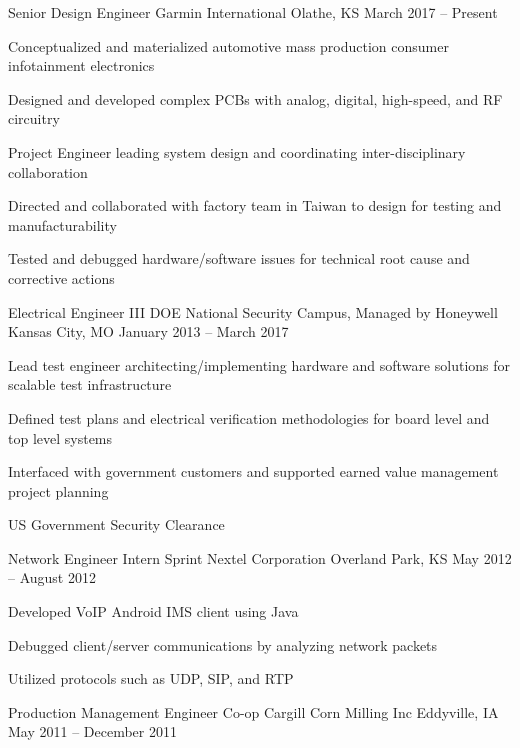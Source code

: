 \documentclass[]{awesome-cv}
\begin{document}
\vspace{-2mm}
\begin{cventries}
	\cventry
	{Senior Design Engineer}
	{Garmin International}
	{Olathe, KS}
	{March 2017 – Present}
	{\begin{cvitems}
		\item {Conceptualized and materialized automotive mass production consumer infotainment electronics}
		\item {Designed and developed complex PCBs with analog, digital, high-speed, and RF circuitry}
		\item {Project Engineer leading system design and coordinating inter-disciplinary collaboration}
		\item {Directed and collaborated with factory team in Taiwan to design for testing and manufacturability}
		\item {Tested and debugged hardware/software issues for technical root cause and corrective actions}
		\end{cvitems}}
	\cventry
	{Electrical Engineer III}
	{DOE National Security Campus, Managed by Honeywell}
	{Kansas City, MO}
	{January 2013 – March 2017}
	{\begin{cvitems}
		\item {Lead test engineer architecting/implementing hardware and software solutions for scalable test infrastructure}
		\item {Defined test plans and electrical verification methodologies for board level and top level systems}
		\item {Interfaced with government customers and supported earned value management project planning}
		\item {US Government Security Clearance }
		\end{cvitems}}
	\cventry
	{Network Engineer Intern}
	{Sprint Nextel Corporation}
	{Overland Park, KS}
	{May 2012 – August 2012}
	{\begin{cvitems}
		\item {Developed VoIP Android IMS client using Java}
		\item {Debugged client/server communications by analyzing network packets}
		\item {Utilized protocols such as UDP, SIP, and RTP}
		\end{cvitems}}
	\cventry
	{Production Management Engineer Co-op}
	{Cargill Corn Milling Inc}
	{Eddyville, IA}
	{May 2011 – December 2011}

\end{cventries}
\end{document}
